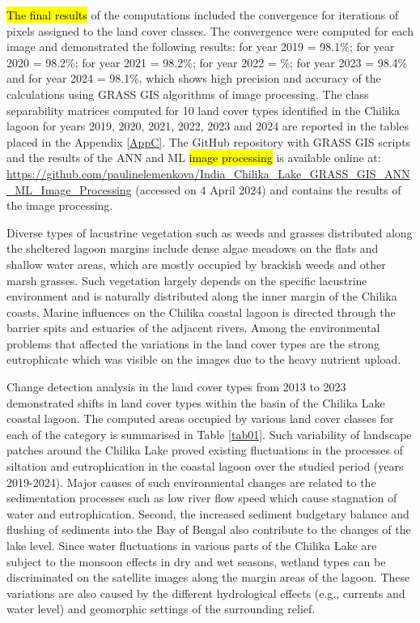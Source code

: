 \documentclass[jmse,article,submit,pdftex,moreauthors]{Definitions/mdpi}
\begin{document}
\hl{The final results} of the computations included the convergence for iterations of pixels assigned to the land cover classes. The convergence were computed for each image and demonstrated the following results: for year 2019 = 98.1\%; for year 2020 = 98.2\%; for year 2021 = 98.2\%; for year 2022 = \%; for year 2023 = 98.4\% and for year 2024 = 98.1\%, which shows high precision and accuracy of the calculations using GRASS GIS algorithms of image processing. The class separability matrices computed for 10 land cover types identified in the Chilika lagoon for years 2019, 2020, 2021, 2022, 2023 and 2024 are reported in the tables placed in the Appendix \ref{AppC}. The\hl{ }GitHub repository with GRASS GIS scripts and the results of the ANN and ML \hl{image processing} is available online at: \href{https://github.com/paulinelemenkova/India_Chilika_Lake_GRASS_GIS_ANN_ML_Image_Processing}{https://github.com/paulinelemenkova/India\_Chilika\_Lake\_GRASS\_GIS\_ANN\_ML\_Image\_Processing} (accessed on 4 April 2024) and contains the results of the image processing. 
 
 Diverse types of lacustrine vegetation such as weeds and grasses distributed along the sheltered lagoon margins include dense algae meadows on the flats and shallow water areas, which are mostly occupied by brackish weeds and other marsh grasses. Such vegetation largely depends on the specific lacustrine environment and is naturally distributed along the inner margin of the Chilika coasts. Marine influences on the Chilika coastal lagoon is directed through the barrier spits and estuaries of the adjacent rivers. Among the environmental problems that affected the variations in the land cover types are the strong eutrophicate which was visible on the images due to the heavy nutrient upload. 

Change detection analysis in the land cover types from 2013 to 2023 demonstrated shifts in land cover types within the basin of the Chilika Lake coastal lagoon. The computed areas occupied by various land cover classes for each of the category is summarised in Table \ref{tab01}. Such variability of landscape patches around the Chilika Lake proved existing fluctuations in the processes of siltation and eutrophication in the coastal lagoon over the studied period (years 2019-2024). Major causes of such environmental changes are related to the sedimentation processes such as low river flow speed which cause stagnation of water and eutrophication. Second, the increased sediment budgetary balance and flushing of sediments into the Bay of Bengal also contribute to the changes of the lake level. Since water fluctuations in various parts of the Chilika Lake are subject to the monsoon effects in dry and wet seasons, wetland types can be discriminated on the satellite images along the margin areas of the lagoon. These variations are also caused by the different hydrological effects (e.g., currents and water level) and geomorphic settings of the surrounding relief. 
 
\end{document}

